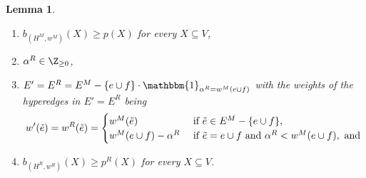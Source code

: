 \documentclass{article}
\newtheorem{lemma}{Lemma}[section]
\newcommand{\indicator}{\ensuremath{\mathbbm{1}}\xspace}
\newcommand{\knote}[1]{{\color{red}[{\tiny Karthik: \bf #1}]\marginpar{\color{red}*}}}
\begin{document}
\begin{lemma}
\begin{enumerate}[label=(\arabic*)]
        \item $b_{(H^M, w^M)}(X) \geq p(X)$ for every $X \subseteq V$,
        \item $\alpha^R \in \Z_{\geq 0}$, 
        \item 
        $E' = E^R = E^M - \{e\cup f\}\cdot \indicator_{\alpha^R=w^M(e\cup f)}$ with the weights of the hyperedges in $E' = E^R$ being 
        \[
        w'(\Tilde{e}) = w^R(\Tilde{e})=
        \begin{cases}
            w^M(\Tilde{e}) &\text { if } \Tilde{e}\in E^M-\{e\cup f\},\\
            w^M(e\cup f) - \alpha^R &\text { if } \Tilde{e}=e\cup f \text{ and } \alpha^R< w^M(e\cup f), \text{ and}  \\
        \end{cases}
        \]
        \item $b_{(H^R, w^R)}(X) \geq p^R(X)$ for every $X \subseteq V$. 
    \end{enumerate}
\end{lemma}
\end{document}
